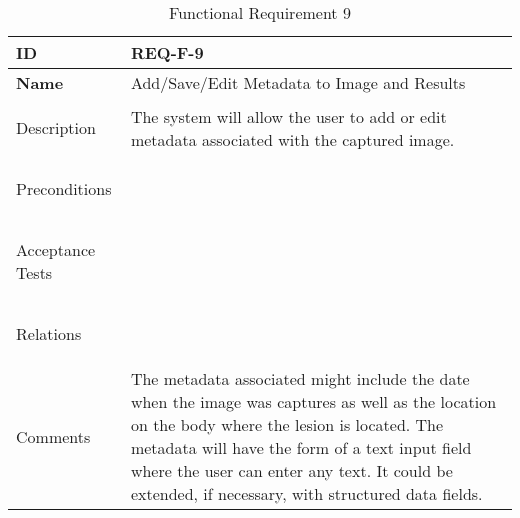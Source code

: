 \begin{table}[H]
    \begin{tabular}[t]{ | >{\bfseries}l | p{9.5cm} |}

    \hline
    ID
    &  REQ-F-9 \\ \hline

    Name
    & Add/Save/Edit Metadata to Image and Results \\ \hline

    Description
    & The system will allow the user to add or edit metadata associated with the captured image. \\ \hline

    Preconditions
    &  \\ \hline

    Acceptance Tests
    & \\ \hline

    Relations
    &  \\ \hline

    Comments &
        The metadata associated might include the date when the image was captures as well as the location on the body where the lesion is located. The metadata will have the form of a text input field where the user can enter any text. It could be extended, if necessary, with structured data fields.

    \\ \hline

    \end{tabular}

    \caption{Functional Requirement 9}
    \label{fig:req_f_9}

\end{table}